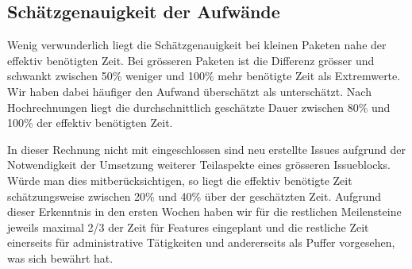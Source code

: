 	\subsection*{Schätzgenauigkeit der Aufwände}
	Wenig verwunderlich liegt die Schätzgenauigkeit bei kleinen Paketen nahe der effektiv benötigten Zeit.
	Bei grösseren Paketen ist die Differenz grösser und schwankt zwischen 50\% weniger und 100\% mehr benötigte Zeit als Extremwerte.
	Wir haben dabei häufiger den Aufwand überschätzt als unterschätzt.
	Nach Hochrechnungen liegt die durchschnittlich geschätzte Dauer zwischen 80\% und 100\% der effektiv benötigten Zeit.
	
	In dieser Rechnung nicht mit eingeschlossen sind neu erstellte Issues aufgrund der Notwendigkeit der Umsetzung weiterer Teilaspekte eines grösseren Issueblocks.
	Würde man dies mitberücksichtigen, so liegt die effektiv benötigte Zeit schätzungsweise zwischen 20\% und 40\% über der geschätzten Zeit.
	Aufgrund dieser Erkenntnis in den ersten Wochen haben wir für die restlichen Meilensteine jeweils maximal 2/3 der Zeit für Features eingeplant
	und die restliche Zeit einerseits für administrative Tätigkeiten und andererseits als Puffer vorgesehen, was sich bewährt hat. 

